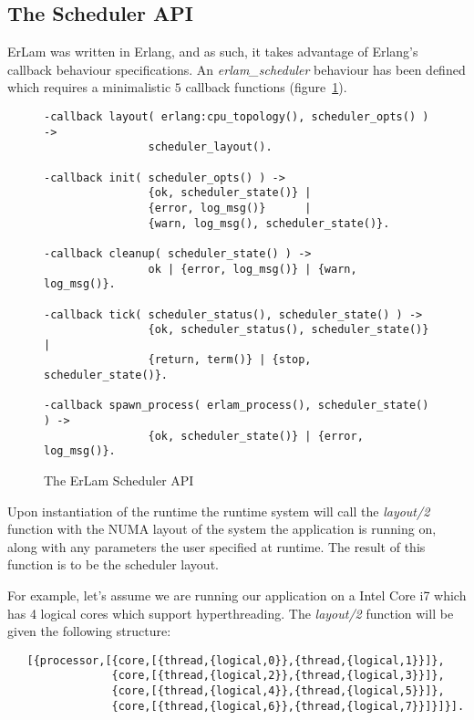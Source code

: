 \subsection{The Scheduler API}\label{sec:the scheduler api}

ErLam was written in Erlang, and as such, it takes advantage of Erlang's 
callback behaviour specifications. An \emph{erlam\_scheduler} behaviour has been 
defined which requires a minimalistic $5$ callback functions 
(figure~\ref{fig:scheduler-api}).

\begin{figure}
    \begin{verbatim}
-callback layout( erlang:cpu_topology(), scheduler_opts() ) -> 
                scheduler_layout().

-callback init( scheduler_opts() ) -> 
                {ok, scheduler_state()} |
                {error, log_msg()}      |
                {warn, log_msg(), scheduler_state()}.

-callback cleanup( scheduler_state() ) -> 
                ok | {error, log_msg()} | {warn, log_msg()}.

-callback tick( scheduler_status(), scheduler_state() ) -> 
                {ok, scheduler_status(), scheduler_state()} |
                {return, term()} | {stop, scheduler_state()}. 

-callback spawn_process( erlam_process(), scheduler_state() ) -> 
                {ok, scheduler_state()} | {error, log_msg()}.
\end{verbatim}
\caption{The ErLam Scheduler API}
\label{fig:scheduler-api}
\end{figure}

Upon instantiation of the runtime the runtime system will call the 
\emph{layout/2} function with the NUMA layout of the system the application is
running on, along with any parameters the user specified at runtime. The 
result of this function is to be the scheduler layout. 

For example, let's assume we are running our application on a Intel Core i7 
which has 4 logical cores which support hyperthreading. The \emph{layout/2}
function will be given the following structure: 

{\footnotesize 
\begin{verbatim}
   [{processor,[{core,[{thread,{logical,0}},{thread,{logical,1}}]},
                {core,[{thread,{logical,2}},{thread,{logical,3}}]},
                {core,[{thread,{logical,4}},{thread,{logical,5}}]},
                {core,[{thread,{logical,6}},{thread,{logical,7}}]}]}].
\end{verbatim}
} 

